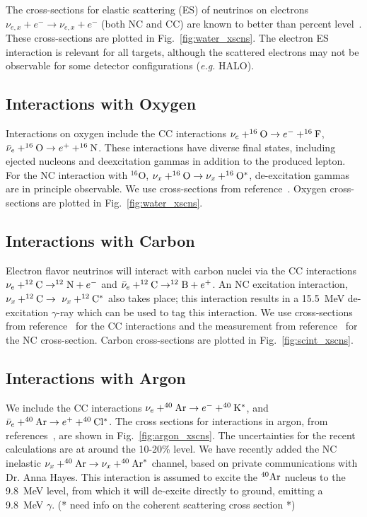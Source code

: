 \documentclass[12pt]{article}
\begin{document}
The cross-sections for elastic scattering (ES) of
neutrinos on electrons $\nu_{e,x} + e^- \rightarrow \nu_{e,x} + e^-$
 (both NC and CC) are known to better than percent level~\cite{Marciano:2003eq}.
These cross-sections are plotted in Fig.~\ref{fig:water_xscns}.
The electron ES interaction is relevant for all targets, although the scattered
electrons may not be observable for some detector configurations
(\textit{e.g.} HALO).


\subsection{Interactions with Oxygen}

Interactions on oxygen include the CC interactions $\nu_e+^{16}{\rm
  O}\rightarrow e^-+^{16}{\rm F}$, $\bar{\nu}_e+^{16}{\rm O}
\rightarrow e^++^{16}{\rm N}$.  
These interactions have diverse final states, including
ejected nucleons and deexcitation gammas in addition to the produced
lepton.  For the NC interaction with $^{16}$O, $\nu_x+^{16}{\rm O}
\rightarrow \nu_x+ ^{16}{\rm O}^*$, de-excitation gammas are in principle
observable.  We use cross-sections from reference~\cite{Kolbe:2002gk}.
Oxygen cross-sections are plotted in Fig.~\ref{fig:water_xscns}.

\subsection{Interactions with Carbon}

Electron flavor neutrinos will interact with carbon nuclei via the CC
interactions $\nu_e+^{12}{\rm C}\rightarrow^{12}{\rm N}+e^-$ and
$\bar{\nu}_e +^{12}{\rm C}\rightarrow ^{12}{\rm B}+e^+$. An NC
excitation interaction, $\nu_x+^{12}{\rm C}\rightarrow~\nu_x+^{12}{\rm
  C}^{*}$ also takes place; this interaction results in a 15.5~MeV
de-excitation $\gamma$-ray which can be used to tag this interaction.
We use cross-sections from reference~\cite{Kolbe:1999au} for the CC interactions and the measurement from reference~\cite{Armbruster:1998gk} for the NC cross-section.
Carbon cross-sections are plotted in Fig.~\ref{fig:scint_xscns}.



\subsection{Interactions with Argon}

We include the CC interactions
$\nu_e + ^{40}{\rm Ar} \rightarrow e^- + ^{40}{\rm K^*}$, and
$\bar{\nu}_e + ^{40}{\rm Ar} \rightarrow e^+ + ^{40}{\rm Cl^*}$.
The cross sections for interactions in argon, from references~\cite{GilBotella:2004bv,Kolbe:2003ys},
are shown in Fig.~\ref{fig:argon_xscns}.   The uncertainties for the recent calculations 
are at around the 10-20\% level.
We have recently added the NC inelastic 
$\nu_x + ^{40}{\rm Ar} \rightarrow \nu_x+ ^{40}{\rm Ar}^*$ channel, based on private
communications with Dr. Anna Hayes.  This interaction is assumed to excite the $^{40}{\rm Ar}$
nucleus to the 9.8~MeV level, from which it will de-excite directly to ground, emitting a 9.8~MeV $\gamma$.
(* need info on the coherent scattering cross section *)
\end{document}
